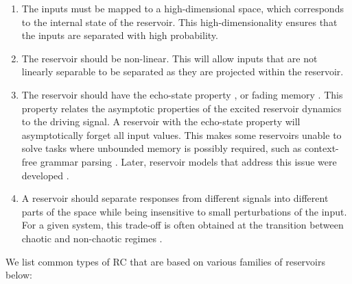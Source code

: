 \begin{enumerate}
  \item The inputs must be mapped to a high-dimensional space, which
        corresponds to the internal state of the reservoir. This
        high-dimensionality ensures that the inputs are separated with high
        probability.

  \item The reservoir should be non-linear. This will allow inputs that are not
        linearly separable to be separated as they are projected within the
        reservoir.

  \item The reservoir should have the echo-state property
        \parencite{jaegerEchoStateApproach2001, yildizRevisitingEchoState2012},
        or fading memory \parencite{boydFadingMemoryProblem1985,
        maassRealTimeComputingStable2002, maassFadingMemoryKernel2004}. This
        property relates the asymptotic properties of the excited reservoir dynamics
        to the driving signal. A reservoir with the echo-state property will
        asymptotically forget all input values. This makes some reservoirs unable
        to solve tasks where unbounded memory is possibly required, such as
        context-free grammar parsing
        \parencite{schmidhuberTrainingRecurrentNetworks2007}. Later, reservoir
        models that address this issue were developed
        \parencite{pascanuNeurodynamicalModelWorking2011}.

  \item A reservoir should separate responses from different signals into
        different parts of the space while being insensitive to small
        perturbations of the input. For a given system, this trade-off is often
        obtained at the transition between chaotic and non-chaotic regimes
        \parencite{bertschingerRealtimeComputationEdge2004,
        legensteinEdgeChaosPrediction2007}.
\end{enumerate}

We list common types of \ac{RC} that are based on various families of reservoirs
below:

